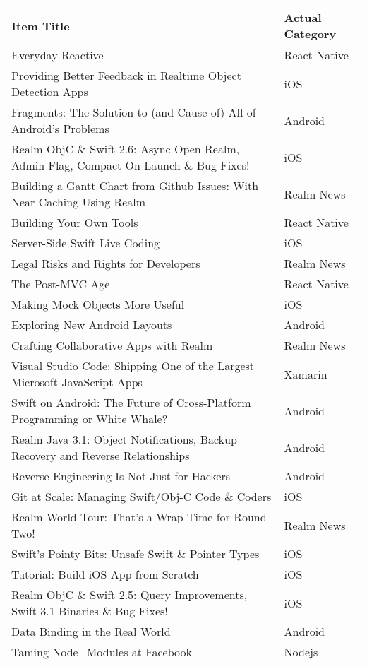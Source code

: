 \documentclass[letterpaper,11pt]{article}
\begin{document}
\begin{table}[htb]
\centering
\begin{tabular}{ | l | l |}
\hline
\textbf{Item Title} & \textbf{Actual Category} \\
\hline
Everyday Reactive & React Native \\ 
Providing Better Feedback in Realtime Object Detection Apps & iOS \\ 
Fragments: The Solution to (and Cause of) All of Android's Problems & Android \\ 
Realm ObjC \& Swift 2.6: Async Open Realm, Admin Flag, Compact On Launch \& Bug Fixes! & iOS \\ 
Building a Gantt Chart from Github Issues: With Near Caching Using Realm & Realm News  \\ 
Building Your Own Tools & React Native  \\ 
Server-Side Swift Live Coding & iOS  \\ 
Legal Risks and Rights for Developers & Realm News  \\ 
The Post-MVC Age & React Native \\ 
Making Mock Objects More Useful & iOS \\ 
Exploring New Android Layouts & Android \\ 
Crafting Collaborative Apps with Realm & Realm News \\ 
Visual Studio Code: Shipping One of the Largest Microsoft JavaScript Apps & Xamarin \\ 
Swift on Android: The Future of Cross-Platform Programming or White Whale? & Android \\ 
Realm Java 3.1: Object Notifications, Backup Recovery and Reverse Relationships & Android \\ 
Reverse Engineering Is Not Just for Hackers & Android \\ 
Git at Scale: Managing Swift/Obj-C Code \& Coders & iOS \\ 
Realm World Tour: That’s a Wrap Time for Round Two! & Realm News \\ 
Swift's Pointy Bits: Unsafe Swift \& Pointer Types & iOS  \\ 
Tutorial: Build iOS App from Scratch & iOS  \\ 
Realm ObjC \& Swift 2.5: Query Improvements, Swift 3.1 Binaries \& Bug Fixes! & iOS\\ 
Data Binding in the Real World & Android \\ 
Taming Node_Modules at Facebook & Nodejs \\ 

\end{tabular}
\end{table}
\end{document}
